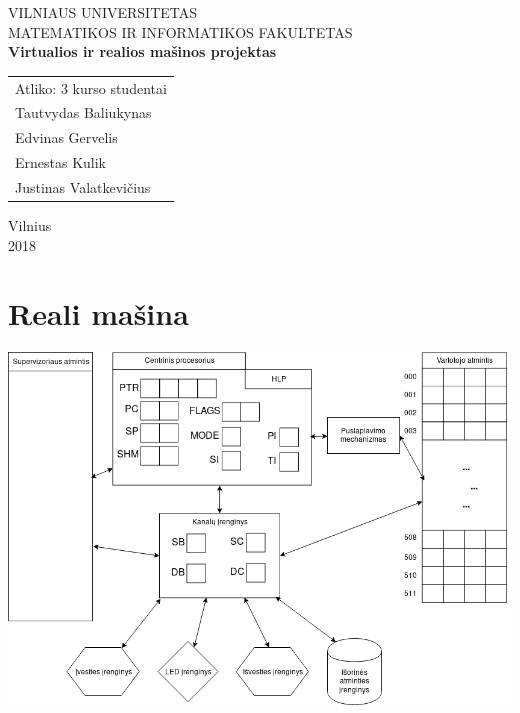 \documentclass{scrartcl}
\begin{document}
    \newcommand{\instr}[3]{\subparagraph{\makebox[6em][l]{\texttt{#1}}} (\texttt{#2})\par#3\par}
    \begin{titlepage}
        \begin{center}
            VILNIAUS UNIVERSITETAS \\
            MATEMATIKOS IR INFORMATIKOS FAKULTETAS \\
            \vspace{4cm}
            \Large\textbf{Virtualios ir realios mašinos projektas}
        \end{center}
        \vspace{4cm}
        \begin{flushright}
            \begin{tabular}[t]{l}
                Atliko: 3 kurso studentai \\
                Tautvydas Baliukynas \\
                Edvinas Gervelis \\
                Ernestas Kulik \\
                Justinas Valatkevičius
            \end{tabular}
        \end{flushright}
        \vspace*{\fill}
        \begin{center}
            \large{Vilnius \\ 2018}
        \end{center}
    \end{titlepage}
    \section{Reali mašina}
        \includegraphics[width=\textwidth]{RM_model}
\end{document}
